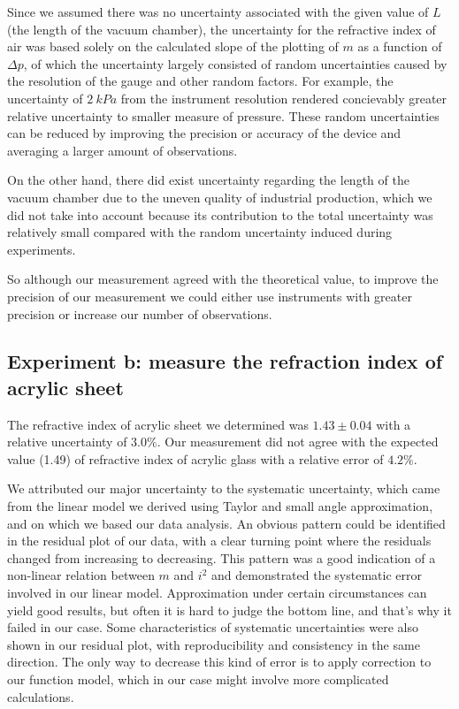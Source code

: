 \documentclass[12pt]{article}
\begin{document}
Since we assumed there was no uncertainty associated with the given value of $L$ (the length of the vacuum chamber), the uncertainty for the refractive index of air was based solely on the calculated slope of the plotting of $m$ as a function of $\Delta{p}$, of which the uncertainty largely consisted of random uncertainties caused by the resolution of the gauge and other random factors. For example, the uncertainty of $\SI{2 }{kPa} $ from the instrument resolution rendered concievably greater relative uncertainty to smaller measure of pressure. These random uncertainties can be reduced by improving the precision or accuracy of the device and averaging a larger amount of observations. 

On the other hand,  there did exist uncertainty regarding the length of the vacuum chamber due to the uneven quality of industrial production, which we did not take into account because its contribution to the total uncertainty was relatively small compared with the random uncertainty induced during experiments. 

So although our measurement agreed with the theoretical value, to improve the precision of our measurement we could either use instruments with greater precision or increase our number of observations. 

\subsection{Experiment b: measure the refraction index of acrylic sheet }
The refractive index of acrylic sheet we determined was $1.43\pm0.04$ with a relative uncertainty of $3.0\%$. Our measurement did not agree with the expected value (1.49) of refractive index of acrylic glass with a relative error of $4.2\%$. 

We attributed our major uncertainty to the systematic uncertainty, which came from the linear model we derived using Taylor and small angle approximation, and on which we based our data analysis. An obvious pattern could be identified in the residual plot of our data, with a clear turning point where the residuals changed from increasing to decreasing. This pattern was a good indication of a non-linear relation between $m$ and $i^{2}$ and demonstrated the systematic error involved in our linear model. Approximation under certain circumstances can yield good results, but often it is hard to judge the bottom line, and that's why it failed in our case. Some characteristics of systematic uncertainties were also shown in our residual plot, with reproducibility and consistency in the same direction. The only way to decrease this kind of error is to apply correction to our function model, which in our case might involve more complicated calculations. 
\end{document}
